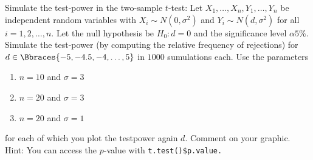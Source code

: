 
\begin{exercise}

Simulate the test-power in the two-sample $t$-test:
Let $X_1, \dots, X_n, Y_1, \dots, Y_n$ be independent random variables with $X_i \sim N(0, \sigma^2)$ and $Y_i \sim N(d, \sigma^2)$ for all $i = 1, 2, \dots, n$.
Let the null hypothesis be $H_0: d = 0$ and the significance level $\alpha 5 \%$.
Simulate the test-power (by computing the relative frequency of rejections) for $d \in \Bbraces{-5, -4.5, -4, \dots, 5}$ in $1000$ sumulations each.
Use the parameters

\begin{enumerate}[label = (\alph*)]
    \item $n = 10$ and $\sigma = 3$
    \item $n = 20$ and $\sigma = 3$
    \item $n = 20$ and $\sigma = 1$
\end{enumerate}

for each of which you plot the testpower again $d$.
Comment on your graphic.
Hint:
You can access the $p$-value with \texttt{t.test()\$p.value.}

\end{exercise}


\begin{solution}

\phantom{}

\end{solution}

